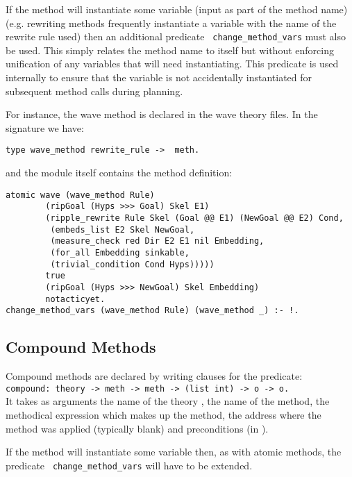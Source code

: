 If the method will instantiate some variable (input as part of the
method name) (e.g. rewriting methods frequently
instantiate a variable with the name of the rewrite rule used) then an additional predicate {\tt
  change\_method\_vars} must also be used.
This simply relates the method name to itself but without enforcing
unification of any variables that will need instantiating.  This
predicate is used internally to ensure that the variable is not
accidentally instantiated for subsequent method calls during planning.

For instance, the wave method is declared in
the wave theory files.  In the signature we have:

\begin{verbatim}
type wave_method rewrite_rule ->  meth.
\end{verbatim}

and the module itself contains the method definition:

\begin{verbatim}
atomic wave (wave_method Rule)
        (ripGoal (Hyps >>> Goal) Skel E1)
        (ripple_rewrite Rule Skel (Goal @@ E1) (NewGoal @@ E2) Cond,
         (embeds_list E2 Skel NewGoal,
         (measure_check red Dir E2 E1 nil Embedding,
         (for_all Embedding sinkable,
         (trivial_condition Cond Hyps)))))
        true
        (ripGoal (Hyps >>> NewGoal) Skel Embedding)
        notacticyet.
change_method_vars (wave_method Rule) (wave_method _) :- !.
\end{verbatim}

\subsection{Compound Methods}
Compound methods are declared by writing clauses for the predicate: \\
{\tt compound: theory -> meth -> meth -> (list int) -> o -> o.}\\
It takes as arguments the name of the theory , the
name of the method, the methodical
expression which makes up the method, the
address where the method was applied (typically blank) and
preconditions (in \lprolog).

If the method will instantiate some variable then, as with atomic
methods, the predicate {\tt
  change\_method\_vars} will have to be
extended.

